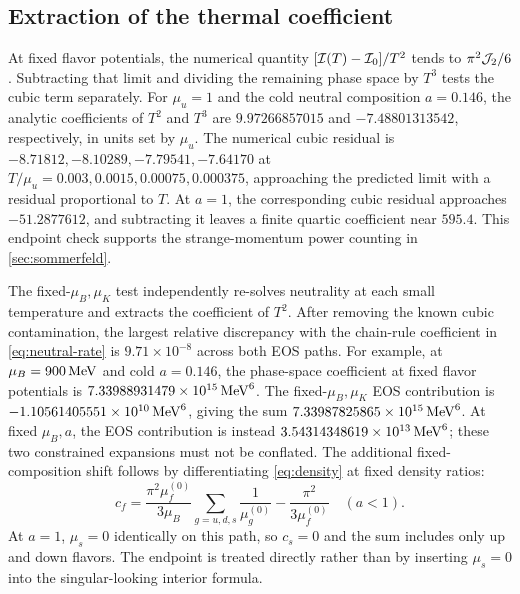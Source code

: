 \subsection{Extraction of the thermal coefficient}
At fixed flavor potentials, the numerical quantity \([\mathcal I(T)-\mathcal I_0]/T^2\) tends to \(\pi^2\mathcal J_2/6\).
Subtracting that limit and dividing the remaining phase space by \(T^3\) tests the cubic term separately.
For \(\mu_u=1\) and the cold neutral composition \(a=0.146\), the analytic coefficients of \(T^2\) and \(T^3\) are \(9.97266857015\) and \(-7.48801313542\), respectively, in units set by \(\mu_u\).
The numerical cubic residual is \(-8.71812,-8.10289,-7.79541,-7.64170\) at \(T/\mu_u=0.003,0.0015,0.00075,0.000375\), approaching the predicted limit with a residual proportional to \(T\).
At \(a=1\), the corresponding cubic residual approaches \(-51.2877612\), and subtracting it leaves a finite quartic coefficient near \(595.4\).
This endpoint check supports the strange-momentum power counting in \cref{sec:sommerfeld}.

The fixed-\(\mu_B,\mu_K\) test independently re-solves neutrality at each small temperature and extracts the coefficient of \(T^2\).
After removing the known cubic contamination, the largest relative discrepancy with the chain-rule coefficient in \cref{eq:neutral-rate} is \(9.71\times10^{-8}\) across both EOS paths.
For example, at \(\mu_B=900\,\mathrm{MeV}\) and cold \(a=0.146\), the phase-space coefficient at fixed flavor potentials is \(7.33988931479\times10^{15}\,\mathrm{MeV}^6\).
The fixed-\(\mu_B,\mu_K\) EOS contribution is \(-1.10561405551\times10^{10}\,\mathrm{MeV}^6\), giving the sum \(7.33987825865\times10^{15}\,\mathrm{MeV}^6\).
At fixed \(\mu_B,a\), the EOS contribution is instead \(3.54314348619\times10^{13}\,\mathrm{MeV}^6\); these two constrained expansions must not be conflated.
The additional fixed-composition shift follows by differentiating \cref{eq:density} at fixed density ratios:
\begin{equation}
 c_f=\frac{\pi^2\mu_f^{(0)}}{3\mu_B}
       \sum_{g=u,d,s}\frac{1}{\mu_g^{(0)}}
       -\frac{\pi^2}{3\mu_f^{(0)}}
 \quad (a<1).
 \label{eq:fixed-composition-shift}
\end{equation}
At \(a=1\), \(\mu_s=0\) identically on this path, so \(c_s=0\) and the sum includes only up and down flavors.
The endpoint is treated directly rather than by inserting \(\mu_s=0\) into the singular-looking interior formula.

